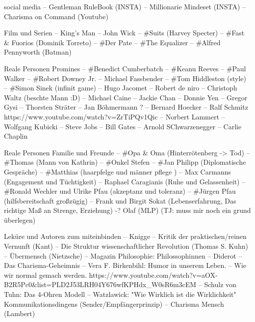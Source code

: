 social media
            -- Gentleman RuleBook (INSTA)
            -- Millionarie Mindeset (INSTA)
            -- Charisma on Command (Youtube)

Film und Serien
            -- King's Man
            -- John Wick 
            -- #Suits (Harvey Specter)
            -- #Fast & Fuorios (Dominik Torreto)
            -- #Der Pate
            -- #The Equalizer
            -- #Alfred Pennyworth (Batman)

Reale Personen Promines
            -- #Benedict Cumberbatch
            -- #Keanu Reeves
            -- #Paul Walker
            -- #Robert Downey Jr. 
            -- Michael Fassbender
            -- #Tom Hiddleston (style)
            -- #Simon Sinek (infinit game)
            -- Hugo Jacomet
            -- Robert de niro
            -- Christoph Waltz (beschte Mann :D)
            -- Michael Caine
            -- Jackie Chan
            -- Donnie Yen
            -- Gregor Gysi
            -- Thorsten Sträter
            -- Jan Böhmermann ? 
            -- Bernard Hoecker
            -- Ralf Schmitz
               https://www.youtube.com/watch?v=ZrTiPQv1Qic
            -- Norbert Lammert
            -- Wolfgang Kubicki
            -- Steve Jobs
            -- Bill Gates
            -- Arnold SChwarzenegger
            -- Carlie Chaplin 
                
Reale Personen Familie und Freunde
            -- #Opa & Oma (Hinterrötenberg -> Tod)
            -- #Thomas (Mann von Kathrin)
            -- #Onkel Stefen
            -- #Jan Philipp  (Diplomatische Gespräche)
            -- #Matthias (haarpfelge und männer pflege )
            -- Max Carmanns (Engagement und Tüchtigkeit)
            -- Raphael Caragianis (Ruhe und Gelassenheit)
            -- #Ronald Wechler und Ulrike Pfau (akzeptanz und toleranz)
            -- #Jürgen Pfau (hilfsbereitschaft großzügig)
            -- Frank und Birgit Sokat (Lebenserfahrung, Das richtige Maß an Strenge, Erziehung)
            -? Olaf (MLP) (TJ: muss mir noch ein grund überlegen)

Leküre und Autoren zum miteinbinden
            -- Knigge
            -- Kritik der praktischen/reinen Vernunft (Kant)
            -- Die Struktur wissenschaftlicher Revolution (Thomas S. Kuhn)
            -- Übermensch (Nietzsche)
            -- Magazin Philosophie: Philossophinnen
            -- Diderot
            -- Das Charisma-Geheimnis 
            -- Vera F. Birkenbihl:  Humor in unserem Leben.
            --                      Wie wir normal gemach werden.
                                    https://www.youtube.com/watch?v=aOX-B2R5Pc0&list=PLD2J53LRH04Y676wfKPHdx_W0sR6m3cEM
            -- Schulz von Tuhn: Das 4-Ohren Modell
            -- Watzlawick:    "Wie Wirklich ist die Wirklichkeit"
                              Kommunikationsdingens (Sender/Empfängerprinzip)
            -- Charisma Mensch (Lambert)

